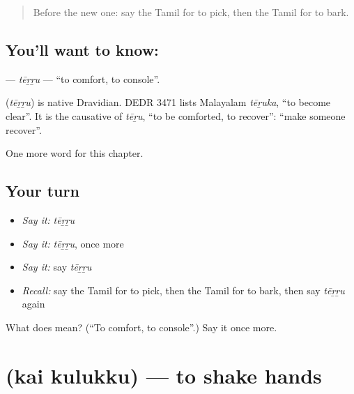 \label{lesson:TA-C258-terru}



\begin{quote}
Before the new one: say the Tamil for to pick, then the Tamil for to bark.
\end{quote}

\subsection*{You'll want to know: }
\textbf{} — \emph{tēṟṟu} — \textquotedblleft{}to comfort, to console\textquotedblright{}.

\begin{cousinweb}
\textbf{} (\emph{tēṟṟu}) is native Dravidian. DEDR 3471 lists Malayalam \emph{tēṟuka}, \textquotedblleft{}to become clear\textquotedblright{}. It is the causative of \emph{tēṟu}, \textquotedblleft{}to be comforted, to recover\textquotedblright{}: \textquotedblleft{}make someone recover\textquotedblright{}.
\end{cousinweb}

\begin{grammarlens}[title={What you've built}]
One more word for this chapter.
\end{grammarlens}

\subsection*{Your turn}
\begin{itemize}
\raggedright
  \item \emph{Say it:} \emph{tēṟṟu}
  \item \emph{Say it:} \emph{tēṟṟu}, once more
  \item \emph{Say it:} say \emph{tēṟṟu}
  \item \emph{Recall:} say the Tamil for to pick, then the Tamil for to bark, then say \emph{tēṟṟu} again
\end{itemize}

\begin{tcolorbox}[breakable,colback=teal!4,colframe=teal!35!black,title={Before you move on}]
What does  mean? (\textquotedblleft{}To comfort, to console\textquotedblright{}.) Say it once more.
\end{tcolorbox}
\section[\texorpdfstring{\ta{கை} \ta{குலுக்கு} (kai kulukku)}{கை குலுக்கு (kai kulukku)}]{  (kai kulukku) — to shake hands}

